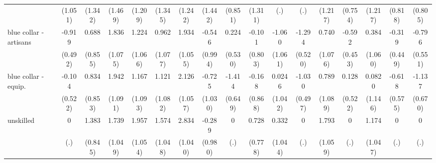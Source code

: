 {\begin{tabular}{l*{16}{c}}
                    &     (1.051)         &     (1.342)         &     (1.469)         &     (1.209)         &     (1.345)         &     (1.242)         &     (1.442)         &     (0.851)         &     (1.311)         &         (.)         &         (.)         &     (1.217)         &     (0.754)         &     (1.217)         &     (0.818)         &     (0.805)         \\
[1em]
blue collar - artisans&      -0.919         &       0.688         &       1.836         &       1.224         &       0.962         &       1.934         &      -0.546         &       0.224         &      -0.101         &      -1.060         &      -1.294\sym{*}  &       0.740         &      -0.592         &       0.384         &      -0.319         &      -0.796         \\
                    &     (0.492)         &     (0.855)         &     (1.075)         &     (1.066)         &     (1.077)         &     (1.055)         &     (0.994)         &     (0.530)         &     (0.803)         &     (1.061)         &     (0.520)         &     (1.076)         &     (0.453)         &     (1.060)         &     (0.449)         &     (0.551)         \\
[1em]
blue collar - equip.&      -0.104         &       0.834         &       1.942         &       1.167         &       1.121         &       2.126\sym{*}  &      -0.725         &      -1.414\sym{*}  &      -0.168         &      0.0246         &      -1.030\sym{*}  &       0.789         &       0.128         &      0.0820         &      -0.618         &      -1.137         \\
                    &     (0.522)         &     (0.853)         &     (1.091)         &     (1.093)         &     (1.082)         &     (1.057)         &     (1.030)         &     (0.649)         &     (0.868)         &     (1.042)         &     (0.497)         &     (1.089)         &     (0.522)         &     (1.146)         &     (0.575)         &     (0.670)         \\
[1em]
unskilled           &           0         &       1.383         &       1.739         &       1.957         &       1.574         &       2.834\sym{**} &      -0.289         &           0         &       0.728         &       0.332         &           0         &       1.793         &           0         &       1.174         &           0         &           0         \\
                    &         (.)         &     (0.845)         &     (1.049)         &     (1.054)         &     (1.048)         &     (1.040)         &     (0.980)         &         (.)         &     (0.778)         &     (1.044)         &         (.)         &     (1.059)         &         (.)         &     (1.047)         &         (.)         &         (.)         \\

\end{tabular}}
